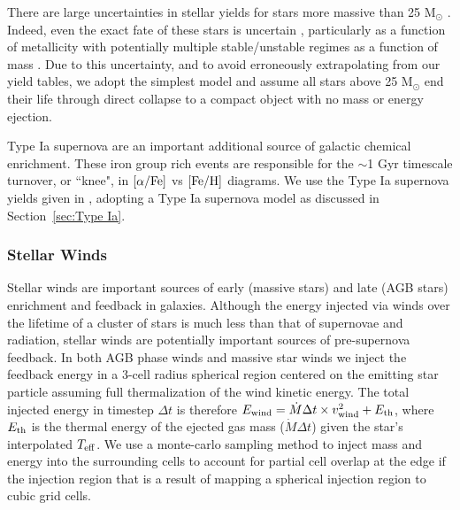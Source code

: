 \documentclass[twocolumn]{aastex61}
\begin{document}
There are large uncertainties in stellar yields for stars more massive than 25 M$_{\odot}$ \citep[][and references therein]{Cote2016}. Indeed, even the exact fate of these stars is uncertain \citep[e.g.][]{Woosley2002,Zhang2008,Ugliano2012}, particularly as a function of metallicity \citep{Fryer2012} with potentially multiple stable/unstable regimes as a function of mass \citep{Heger2003}. Due to this uncertainty, and to avoid erroneously extrapolating from our yield tables, we adopt the simplest model and assume all stars above 25 M$_{\odot}$ end their life through direct collapse to a compact object with no mass or energy ejection.

Type Ia supernova are an important additional source of galactic chemical enrichment. These iron group rich events are responsible for the $\sim$1 Gyr timescale turnover, or ``knee", in $[\alpha/\rm{Fe}]$ vs $[\rm{Fe}/\rm{H}]$ diagrams. We use the Type Ia supernova yields given in \cite{Thielemann1986}, adopting a Type Ia supernova model as discussed in Section~\ref{sec:Type Ia}. 

\subsubsection{Stellar Winds}
\label{sec:stellar winds}
Stellar winds are important sources of early (massive stars) and late (AGB stars) enrichment and feedback in galaxies. Although the energy injected via winds over the lifetime of a cluster of stars is much less than that of supernovae and radiation, stellar winds are potentially important sources of pre-supernova feedback. In both AGB phase winds and massive star winds we inject the feedback energy in a 3-cell radius spherical region centered on the emitting star particle assuming full thermalization of the wind kinetic energy. The total injected energy in timestep $\Delta t$ is therefore $E_{\rm wind} = \dot{M}\Delta t \times v^2_{\rm wind} + E_{\rm th}$, where $E_{\rm th}$ is the thermal energy of the ejected gas mass ($\dot{M}\Delta t$) given the star's interpolated $T_{\rm eff}$. We use a monte-carlo sampling method to inject mass and energy into the surrounding cells to account for partial cell overlap at the edge if the injection region that is a result of mapping a spherical injection region to cubic grid cells.
\end{document}
